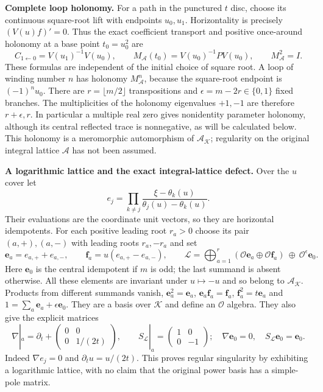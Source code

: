 \HH\textbf{Complete loop holonomy.}
For a path in the punctured $t$ disc, choose its continuous square-root
lift with endpoints $u_0,u_1$. Horizontality is precisely
$(V(u)f)'=0$. Thus the exact coefficient transport and positive
once-around holonomy at a base point $t_0=u_0^2$ are
\[
 C_{1\gets0}=V(u_1)^{-1}V(u_0),\qquad
 M_{\mathcal A}(t_0)=V(u_0)^{-1}P V(u_0),\qquad
 M_{\mathcal A}^2=I.
 \tag{HH9}\label{hh:monodromy}
\]
These formulas are independent of the initial choice of square root.
A loop of winding number $n$ has holonomy $M_{\mathcal A}^n$,
because the square-root endpoint is $(-1)^nu_0$.
There are $r=\lfloor m/2\rfloor$ transpositions and
$\epsilon=m-2r\in\{0,1\}$ fixed branches. The multiplicities of
the holonomy eigenvalues $+1,-1$ are therefore $r+\epsilon,r$.
In particular a multiple real zero gives nonidentity parameter
holonomy, although its central reflected trace is nonnegative,
as will be calculated below. This holonomy is a meromorphic
automorphism of $\mathcal A_{\mathcal K}$; regularity on the original
integral lattice $\mathcal A$ has not been assumed.

\HH\textbf{A logarithmic lattice and the exact integral-lattice defect.}
Over the $u$ cover let
\[
 e_j=\prod_{k\ne j}\frac{\xi-\theta_k(u)}
                               {\theta_j(u)-\theta_k(u)}.
 \tag{HH10}
\]
Their evaluations are the coordinate unit vectors, so they are
horizontal idempotents. For each positive leading root $r_a>0$
choose its pair $(a,+),(a,-)$ with leading roots $r_a,-r_a$ and set
\[
 \mathbf e_a=e_{a,+}+e_{a,-},\qquad
 \mathbf f_a=u(e_{a,+}-e_{a,-}),\qquad
 \mathcal L=\bigoplus_{a=1}^r
  (\mathcal O\mathbf e_a\oplus\mathcal O\mathbf f_a)
       \ \oplus\ \mathcal O^\epsilon\mathbf e_0 .
 \tag{HH11}\label{hh:loglattice}
\]
Here $\mathbf e_0$ is the central idempotent if $m$ is odd; the last
summand is absent otherwise. All these elements are invariant under
$u\mapsto-u$ and so belong to $\mathcal A_{\mathcal K}$.
Products from different summands vanish,
$\mathbf e_a^2=\mathbf e_a$,
$\mathbf e_a\mathbf f_a=\mathbf f_a$,
$\mathbf f_a^2=t\mathbf e_a$ and
$1=\sum_a\mathbf e_a+\epsilon\mathbf e_0$.
They are a basis over $\mathcal K$ and define an $\mathcal O$ algebra.
They also give the explicit matrices
\[
 \nabla|_a=\partial_t+
       \begin{pmatrix}0&0\\0&1/(2t)\end{pmatrix},\qquad
 S_{\mathcal L}|_a=\begin{pmatrix}1&0\\0&-1\end{pmatrix};
 \quad \nabla\mathbf e_0=0,\quad S_{\mathcal L}\mathbf e_0=\mathbf e_0 .
 \tag{HH12}\label{hh:logconnection}
\]
Indeed $\nabla e_j=0$ and $\partial_tu=u/(2t)$.
This proves regular singularity by exhibiting a logarithmic lattice,
with no claim that the original power basis has a simple-pole matrix.

